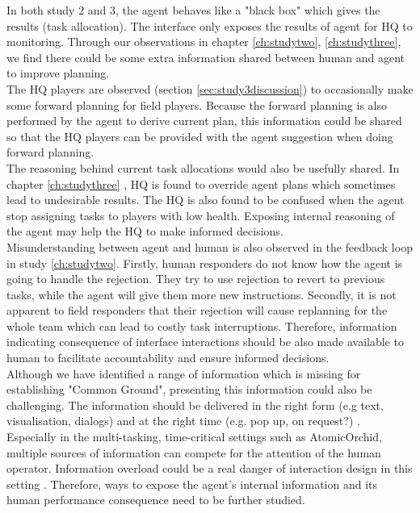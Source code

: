 In both study 2 and 3, the agent behaves like a "black box" which gives the results (task allocation). The interface only exposes the results of agent for HQ to monitoring. Through our observations in chapter \ref{ch:studytwo}, \ref{ch:studythree}, we find there could be some extra information shared between human and agent to improve planning.\\

The HQ players are observed (section \ref{sec:study3discussion}) to occasionally make some forward planning for field players. Because the forward planning is also performed by the agent to derive current plan, this information could be shared so that the HQ players can be provided with the agent suggestion when doing forward planning.\\

The reasoning behind current task allocations would also be usefully shared. In chapter \ref{ch:studythree} , HQ is found to override agent plans which sometimes lead to undesirable results. The HQ is also found to be confused when the agent stop assigning tasks to players with low health. Exposing internal reasoning of the agent may help the HQ to make informed decisions. \\

Misunderstanding between agent and human is also observed in the feedback loop in study \ref{ch:studytwo}. Firstly, human responders do not know how the agent is going to handle the rejection. They try to use rejection to revert to previous tasks, while the agent will give them more new instructions. Secondly, it is not apparent to field responders that their rejection will cause replanning for the whole team which can lead to costly task interruptions. Therefore, information indicating consequence of interface interactions should be also made available to human to facilitate accountability and ensure informed decisions. \\

Although we have identified a range of information which is missing for establishing "Common Ground", presenting this information could also be challenging. The information should be delivered in the right form (e.g text, visualisation, dialogs) and at the right time (e.g. pop up, on request?) \cite{Carver2007}. Especially in the multi-tasking, time-critical settings such as AtomicOrchid, multiple sources of information can compete for the attention of the human operator. Information overload could be a real danger of interaction design in this setting \cite{Lieberman2003}. Therefore, ways to expose the agent's internal information and its human performance consequence need to be further studied.   \\


